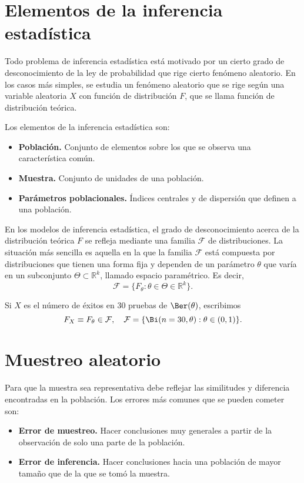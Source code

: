 \section{Elementos de la inferencia estadística}
Todo problema de inferencia estadística está motivado por un cierto grado de desconocimiento de la ley de probabilidad que rige cierto fenómeno aleatorio.
En los casos más simples, se estudia un fenómeno aleatorio que se rige según una variable aleatoria $X$ con función de distribución $F$, que se llama función de distribución teórica.

Los elementos de la inferencia estadística son:
\begin{itemize}
    \item \textbf{Población.}
    Conjunto de elementos sobre los que se observa una característica común.
    \item \textbf{Muestra.}
    Conjunto de unidades de una población.
    \item \textbf{Parámetros poblacionales.}
    Índices centrales y de dispersión que definen a una población.
\end{itemize}

En los modelos de inferencia estadística, el grado de desconocimiento acerca de la distribución teórica $F$ se refleja mediante una familia $\mathcal{F}$ de distribuciones.
La situación más sencilla es aquella en la que la familia $\mathcal{F}$ está compuesta por distribuciones que tienen una forma fija y dependen de un parámetro $\theta$ que varía en un subconjunto $\Theta \subset \mathbb{R}^k$, llamado espacio paramétrico.
Es decir,
$$\mathcal{F} = \{ F_{\theta} : \theta \in \Theta \in \mathbb{R}^k \}.$$

\begin{example}
    Si $X$ es el número de éxitos en 30 pruebas de $\Ber(\theta)$, escribimos
    $$F_X \equiv F_\theta \in \mathcal{F}, \quad \mathcal{F} = \{ \Bi(n = 30, \theta) : \theta \in (0, 1) \}.$$
\end{example}

\section{Muestreo aleatorio}
Para que la muestra sea representativa debe reflejar las similitudes y diferencia encontradas en la población.
Los errores más comunes que se pueden cometer son:
\begin{itemize}
    \item \textbf{Error de muestreo.}
    Hacer conclusiones muy generales a partir de la observación de solo una parte de la población.
    \item \textbf{Error de inferencia.}
    Hacer conclusiones hacia una población de mayor tamaño que de la que se tomó la muestra.
\end{itemize}

